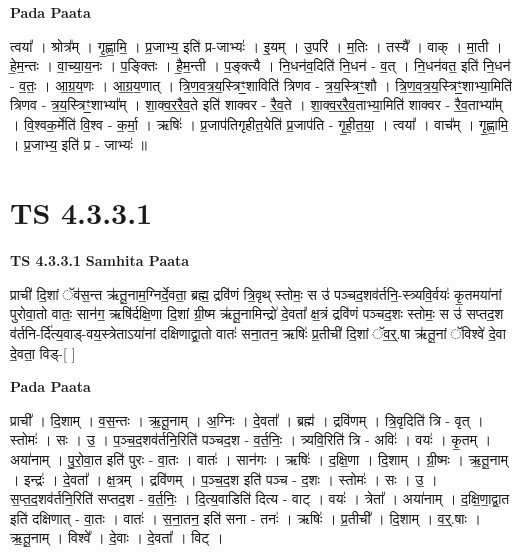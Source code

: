 \documentclass[17pt]{extarticle}
\begin{document}
\textbf{Pada Paata} \newline

त्वया᳚ । श्रोत्र᳚म् । गृ॒ह्णा॒मि॒ । प्र॒जाभ्य॒ इति॑ प्र-जाभ्यः॑ । इ॒यम् । उ॒परि॑ । म॒तिः । तस्यै᳚ । वाक् । मा॒ती । हे॒म॒न्तः । वा॒च्या॒य॒नः । प॒ङ्क्तिः । है॒म॒न्ती । प॒ङ्क्त्यै । नि॒धन॑व॒दिति॑ नि॒धन॑ - व॒त् । नि॒धन॑वत॒ इति॑ नि॒धन॑ - व॒तः॒ । आ॒ग्र॒य॒णः । आ॒ग्र॒य॒णात् । त्रि॒ण॒व॒त्र॒य॒स्त्रिꣳ॒॒शाविति॑ त्रिणव - त्र॒य॒स्त्रिꣳ॒॒शौ । त्रि॒ण॒व॒त्र॒य॒स्त्रिꣳ॒॒शाभ्या॒मिति॑ त्रिणव - त्र॒य॒स्त्रिꣳ॒॒शाभ्या᳚म् । शा॒क्व॒र॒रै॒व॒ते इति॑ शाक्वर - रै॒व॒ते । शा॒क्व॒र॒रै॒व॒ताभ्या॒मिति॑ शाक्वर - रै॒व॒ताभ्या᳚म् । वि॒श्वक॒र्मेति॑ वि॒श्व - क॒र्मा॒ । ऋषिः॑ । प्र॒जाप॑तिगृहीत॒येति॑ प्र॒जाप॑ति - गृ॒ही॒त॒या॒ । त्वया᳚ । वाच᳚म् । गृ॒ह्णा॒मि॒ । प्र॒जाभ्य॒ इति॑ प्र - जाभ्यः॑ ॥  \newline





\section{ TS 4.3.3.1 }

\textbf{TS 4.3.3.1 } \newline
\textbf{Samhita Paata} \newline

प्राची॑ दि॒शां ॅव॑स॒न्त ऋ॑तू॒नाम॒ग्निर्दे॒वता॒ ब्रह्म॒ द्रवि॑णं त्रि॒वृथ् स्तोमः॒ स उ॑ पञ्चद॒शव॑र्तनि॒-स्त्र्यवि॒र्वयः॑ कृ॒तमया॑नां पुरोवा॒तो वातः॒ सान॑ग॒ ऋषि॑र्दक्षि॒णा दि॒शां ग्री॒ष्म ऋ॑तू॒नामिन्द्रो॑ दे॒वता᳚ क्ष॒त्रं द्रवि॑णं पञ्चद॒शः स्तोमः॒ स उ॑ सप्तद॒श व॑र्तनि-र्दि॑त्य॒वाड्-वय॒स्त्रेताऽया॑नां दक्षिणाद्वा॒तो वातः॑ सना॒तन॒ ऋषिः॑ प्र॒तीची॑ दि॒शां ॅव॒र्॒.षा ऋ॑तू॒नां ॅविश्वे॑ दे॒वा दे॒वता॒ विड्-[  ] \newline

\textbf{Pada Paata} \newline

प्राची᳚ । दि॒शाम् । व॒स॒न्तः । ऋ॒तू॒नाम् । अ॒ग्निः । दे॒वता᳚ । ब्रह्म॑ । द्रवि॑णम् । त्रि॒वृदिति॑ त्रि - वृत् । स्तोमः॑ । सः । उ॒ । प॒ञ्च॒द॒शव॑र्तनि॒रिति॑ पञ्चद॒श - व॒र्त॒निः॒ । त्र्यवि॒रिति॑ त्रि - अविः॑ । वयः॑ । कृ॒तम् । अया॑नाम् । पु॒रो॒वा॒त इति॑ पुरः - वा॒तः । वातः॑ । सान॑गः । ऋषिः॑ । द॒क्षि॒णा । दि॒शाम् । ग्री॒ष्मः । ऋ॒तू॒नाम् । इन्द्रः॑ । दे॒वता᳚ । क्ष॒त्रम् । द्रवि॑णम् । प॒ञ्च॒द॒श इति॑ पञ्च - द॒शः । स्तोमः॑ । सः । उ॒ । स॒प्त॒द॒शव॑र्तनि॒रिति॑ सप्तद॒श - व॒र्त॒निः॒ । दि॒त्य॒वाडिति॑ दित्य - वाट् । वयः॑ । त्रेता᳚ । अया॑नाम् । द॒क्षि॒णा॒द्वा॒त इति॑ दक्षिणात् - वा॒तः । वातः॑ । स॒ना॒तन॒ इति॑ सना - तनः॑ । ऋषिः॑ । प्र॒तीची᳚ । दि॒शाम् । व॒र्॒.षाः । ऋ॒तू॒नाम् । विश्वे᳚ । दे॒वाः । दे॒वता᳚ । विट् ।  \newline
\end{document}
